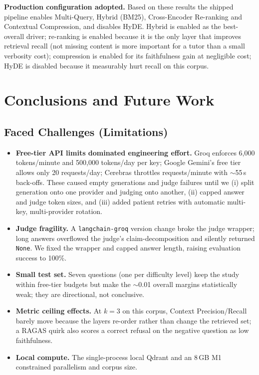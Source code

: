 \documentclass[12pt,a4paper]{report}
\begin{document}
\noindent\textbf{Production configuration adopted.} Based on these results the
shipped pipeline enables Multi-Query, Hybrid (BM25), Cross-Encoder Re-ranking and
Contextual Compression, and disables HyDE. Hybrid is enabled as the best-overall
driver; re-ranking is enabled because it is the only layer that improves retrieval
recall (not missing content is more important for a tutor than a small verbosity
cost); compression is enabled for its faithfulness gain at negligible cost; HyDE
is disabled because it measurably hurt recall on this corpus.

\chapter{Conclusions and Future Work}
\section{Faced Challenges (Limitations)}
\begin{itemize}[nosep]
  \item \textbf{Free-tier API limits dominated engineering effort.} Groq enforces
        6{,}000 tokens/minute and 500{,}000 tokens/day per key; Google Gemini's
        free tier allows only 20 requests/day; Cerebras throttles requests/minute
        with $\sim$55\,s back-offs. These caused empty generations and judge
        failures until we (i) split generation onto one provider and judging onto
        another, (ii) capped answer and judge token sizes, and (iii) added patient
        retries with automatic multi-key, multi-provider rotation.
  \item \textbf{Judge fragility.} A \texttt{langchain-groq} version change broke
        the judge wrapper; long answers overflowed the judge's claim-decomposition
        and silently returned \texttt{None}. We fixed the wrapper and capped
        answer length, raising evaluation success to 100\%.
  \item \textbf{Small test set.} Seven questions (one per difficulty level) keep
        the study within free-tier budgets but make the $\sim$0.01 overall margins
        statistically weak; they are directional, not conclusive.
  \item \textbf{Metric ceiling effects.} At $k=3$ on this corpus, Context
        Precision/Recall barely move because the layers re-order rather than
        change the retrieved set; a RAGAS quirk also scores a correct refusal on
        the negative question as low faithfulness.
  \item \textbf{Local compute.} The single-process local Qdrant and an 8\,GB M1
        constrained parallelism and corpus size.
\end{itemize}
\end{document}
